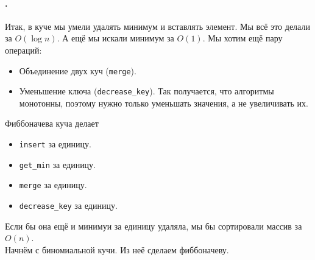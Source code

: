 \documentclass{article}
\newcommand{\pseudo}{PseudoLexer.py:PseudoLexer -x}
\newcommand{\pseudocode}[1]{\texttt{#1}}
\begin{document}
    \paragraph{.}
    Итак, в куче мы умели удалять минимум и вставлять элемент. Мы всё это делали за $O(\log n)$. А ещё мы искали минимум за $O(1)$. Мы хотим ещё пару операций:
    \begin{itemize}
        \item Объединение двух куч (\pseudocode{merge}).
        \item Уменьшение ключа (\pseudocode{decrease_key}). Так получается, что алгоритмы монотонны, поэтому нужно только уменьшать значения, а не увеличивать их.
    \end{itemize}
    Фиббоначева куча делает
    \begin{itemize}
        \item \pseudocode{insert} за единицу.
        \item \pseudocode{get_min} за единицу.
        \item \pseudocode{merge} за единицу.
        \item \pseudocode{decrease_key} за единицу.
    \end{itemize}
    Если бы она ещё и минимуи за единицу удаляла, мы бы сортировали массив за $O(n)$.\\
    Начнём с биномиальной кучи. Из неё сделаем фиббоначеву.
\end{document}
